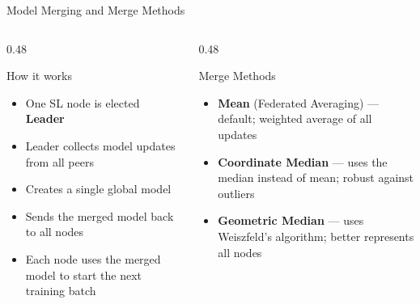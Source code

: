 \documentclass[aspectratio=169]{beamer}
\begin{document}
\begin{frame}{Model Merging and Merge Methods}
    \begin{columns}[T]
        \begin{column}{0.48\textwidth}
            \begin{block}{How it works}
                \begin{itemize}
                    \item One SL node is elected \textbf{Leader}
                    \item Leader collects model updates from all peers
                    \item Creates a single global model
                    \item Sends the merged model back to all nodes
                    \item Each node uses the merged model to start the next training batch
                \end{itemize}
            \end{block}
        \end{column}
        \begin{column}{0.48\textwidth}
            \begin{block}{Merge Methods}
                \begin{itemize}
                    \item \textbf{Mean} (Federated Averaging) — default; weighted average of all updates
                    \item \textbf{Coordinate Median} — uses the median instead of mean; robust against outliers
                    \item \textbf{Geometric Median} — uses Weiszfeld's algorithm; better represents all nodes
                \end{itemize}
            \end{block}
        \end{column}
    \end{columns}
\end{frame}
\end{document}
